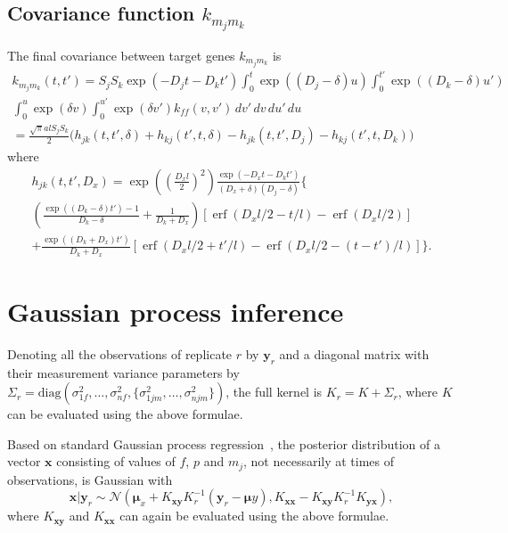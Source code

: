 \documentclass{article}
\newcommand{\erf}{\operatorname{erf}}
\begin{document}
\subsection{Covariance function $k_{m_j m_k}$}

The final covariance between target genes $k_{m_j m_k}$ is
\begin{multline}
  k_{m_j m_k}(t, t') = S_j S_k \exp(-D_j t - D_k t')
  \int_0^t \exp((D_j - \delta) u)
  \int_0^{t'} \exp((D_k - \delta) u') \\
  \int_0^u \exp(\delta v) \int_0^{u'} \exp(\delta v') k_{ff}(v, v') \, dv'\, dv\, du'\, du \\
  = \frac{\sqrt{\pi} a l S_j S_k}{2} \bigg(
  h_{jk}(t, t', \delta) + h_{kj}(t', t, \delta) 
  - h_{jk}(t, t', D_j) - h_{kj}(t', t, D_k)
  \bigg)
\end{multline}
where
\begin{multline}
  h_{jk}(t, t', D_x) = 
  \exp\left(\left(\frac{D_x l}{2}\right)^2\right)
  \frac{\exp(-D_x t - D_k t')}{(D_x + \delta) (D_j - \delta)}
  \bigg\{ 
   \\
  \left(\frac{\exp((D_k-\delta) t') - 1}{D_k-\delta} +
    \frac{1}{D_k + D_x} \right)
  [\erf(D_x l/2 - t/l) - \erf(D_x l/2)]
  \\
  + \frac{\exp((D_k+D_x)t')}{D_k+D_x}
  [\erf(D_x l/2 + t'/l)
  - \erf(D_x l/2 - (t-t')/l)]
  \bigg\}.
\end{multline}

\section{Gaussian process inference}

Denoting all the observations of replicate $r$ by $\bm y_r$ and a
diagonal matrix with their measurement variance parameters by
$\Sigma_r = \mathrm{diag}(\sigma_{1f}^2, \ldots, \sigma_{nf}^2,
\{\sigma_{1jm}^2, \ldots, \sigma_{njm}^2\})$, the
full kernel is $K_r = K + \Sigma_r$, where $K$ can be evaluated using
the above formulae.

Based on standard Gaussian process regression~\cite{Rasmussen2006},
the posterior distribution of a vector $\bm x$ consisting of values of
$f$, $p$ and $m_j$, not necessarily at times of observations, is
Gaussian with
\begin{equation}
  \label{eq:gp_posterior}
  \bm x | \bm y_r \sim 
  \mathcal{N}(\bm \mu_x + K_{\bm x \bm y} K_r^{-1} (\bm y_r - \bm \mu y),
  K_{\bm x \bm x} - K_{\bm x \bm y} K_r^{-1} K_{\bm y \bm x}),
\end{equation}
where $K_{\bm x \bm y}$ and $K_{\bm x \bm x}$ can again be evaluated
using the above formulae.
\end{document}
